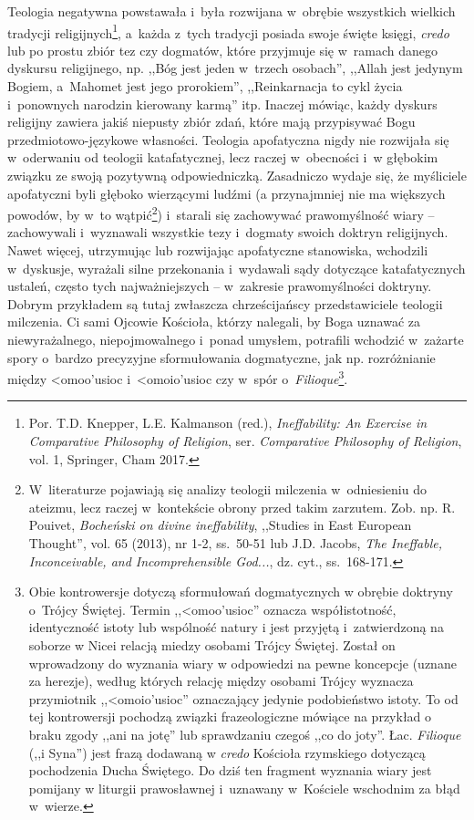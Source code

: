 Teologia negatywna powstawała i~była rozwijana w~obrębie wszystkich wielkich tradycji religijnych\footnote{Por. T.D. Knepper, L.E. Kalmanson (red.), \textit{Ineffability: An Exercise in Comparative Philosophy of Religion}, ser. \textit{Comparative Philosophy of Religion}, vol. 1, Springer, Cham 2017.}, a~każda z~tych tradycji posiada swoje święte księgi, \textit{credo} lub po prostu zbiór tez czy dogmatów, które przyjmuje się w~ramach danego dyskursu religijnego, np. ,,Bóg jest jeden w~trzech osobach'', ,,Allah jest jedynym Bogiem, a~Mahomet jest jego prorokiem'', ,,Reinkarnacja to cykl życia i~ponownych narodzin kierowany karmą'' itp. Inaczej mówiąc, każdy dyskurs religijny zawiera jakiś niepusty zbiór zdań, które mają przypisywać Bogu przedmiotowo-językowe własności. Teologia apofatyczna nigdy nie rozwijała się w~oderwaniu od teologii katafatycznej, lecz raczej w~obecności i~w głębokim związku ze swoją pozytywną odpowiedniczką. Zasadniczo wydaje się, że myśliciele apofatyczni byli głęboko wierzącymi ludźmi (a przynajmniej nie ma większych powodów, by w~to wątpić\footnote{W~literaturze pojawiają się analizy teologii milczenia w~odniesieniu do ateizmu, lecz raczej w~kontekście obrony przed takim zarzutem. Zob. np. R. Pouivet, \textit{Bocheński on divine ineffability}, ,,Studies in East European Thought'', vol. 65 (2013), nr 1-2, ss.~50-51 lub J.D. Jacobs, \textit{The Ineffable, Inconceivable, and Incomprehensible God...}, dz. cyt., ss.~168-171.}) i~starali się zachowywać prawomyślność wiary -- zachowywali i~wyznawali wszystkie tezy i~dogmaty swoich doktryn religijnych. Nawet więcej, utrzymując lub rozwijając apofatyczne stanowiska, wchodzili w~dyskusje, wyrażali silne przekonania i~wydawali sądy dotyczące katafatycznych ustaleń, często tych najważniejszych -- w~zakresie prawomyślności doktryny. Dobrym przykładem są tutaj zwłaszcza chrześcijańscy przedstawiciele teologii milczenia. Ci sami Ojcowie Kościoła, którzy nalegali, by Boga uznawać za niewyrażalnego, niepojmowalnego i~ponad umysłem, potrafili wchodzić w~zażarte spory o~bardzo precyzyjne sformułowania dogmatyczne, jak np. rozróżnianie między
\textgreek{<omoo'usioc}
i~\textgreek{<omoio'usioc}
czy w~spór o~\textit{Filioque}\footnote{Obie kontrowersje dotyczą sformułowań dogmatycznych w obrębie doktryny o~Trójcy Świętej. Termin ,,\textgreek{<omoo'usioc}'' oznacza współistotność, identyczność istoty lub wspólność natury i jest przyjętą i~zatwierdzoną na soborze w Nicei relacją miedzy osobami Trójcy Świętej. Został on wprowadzony do wyznania wiary w odpowiedzi na pewne koncepcje (uznane za herezje), według których relację między osobami Trójcy wyznacza przymiotnik ,,\textgreek{<omoio'usioc}'' oznaczający jedynie podobieństwo istoty. To od tej kontrowersji pochodzą związki frazeologiczne mówiące na przykład o braku zgody ,,ani na jotę'' lub sprawdzaniu czegoś ,,co do joty''. Łac. \textit{Filioque} (,,i Syna'') jest frazą dodawaną w \textit{credo} Kościoła rzymskiego dotyczącą pochodzenia Ducha Świętego. Do dziś ten fragment wyznania wiary jest pomijany w liturgii prawosławnej i~uznawany w~Kościele wschodnim za błąd w~wierze.}.

